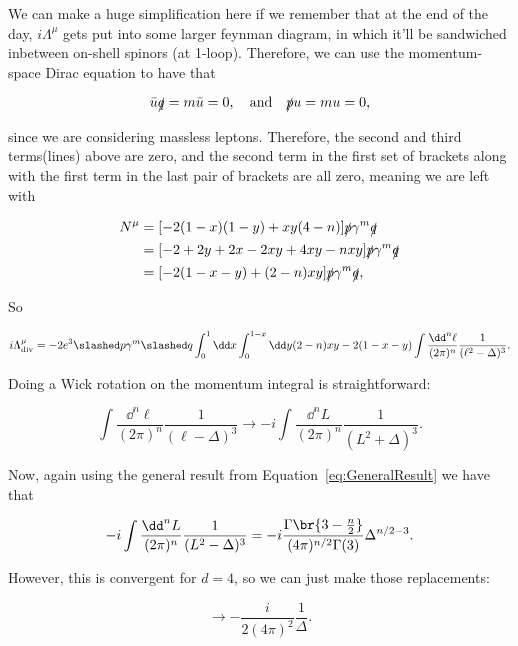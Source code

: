 \documentclass[titlepage]{article}
\begin{document}
We can make a huge simplification here if we remember that at the end of the day, $i\Lambda^\mu$ gets put into some larger feynman diagram, in which it'll be sandwiched inbetween on-shell spinors (at 1-loop). Therefore, we can use the momentum-space Dirac equation to have that

\begin{equation}
  \bar{u}\slashed{q} = m\bar{u} = 0, \quad\mathrm{and}\quad \slashed{p} u = mu = 0,
\end{equation}

since we are considering massless leptons. Therefore, the second and third terms(lines) above are zero, and the second term in the first set of brackets along with the first term in the last pair of brackets are all zero, meaning we are left with

\begin{align}
  N^\mu &= [-2(1-x)(1-y) + xy(4-n)] \slashed{p}\gamma^m\slashed{q}\\
        &= [-2 + 2y + 2x - 2xy + 4xy - nxy] \slashed{p}\gamma^m\slashed{q}\\
  &= [-2(1-x-y) + (2-n)xy] \slashed{p}\gamma^m\slashed{q},
\end{align}

So

\begin{equation}
  i\Lambda^\mu_{\mathrm{div}} = -2e^3 \psl\gamma^m\qsl \int_0^1 \dd x \int_0^{1-x} \dd y (2-n)xy - 2(1-x-y) \int \frac{\dd^n\ell}{(2\pi)^n} \frac{1}{(\ell^2 - \Delta)^3}.
\end{equation}

Doing a Wick rotation on the momentum integral is straightforward:

\begin{equation}
  \int \frac{\dd^n\ell}{(2\pi)^n} \frac{1}{(\ell - \Delta)^3} \rightarrow -i\int \frac{\dd^nL}{(2\pi)^n} \frac{1}{(L^2 + \Delta)^3}.
\end{equation}

Now, again using the general result from Equation~\eqref{eq:GeneralResult} we have that

\begin{equation}
  -i\int \frac{\dd^nL}{(2\pi)^n} \frac{1}{(L^2 - \Delta)^3} = -i \frac{\Gamma\br{3 - \frac{n}{2}}}{(4\pi)^{n/2}\Gamma(3)}\Delta^{n/2-3}.
\end{equation}

However, this is convergent for $d=4$, so we can just make those replacements:

\begin{equation}
  \rightarrow - \frac{i}{2(4\pi)^2} \frac{1}{\Delta}.
\end{equation}
\end{document}
